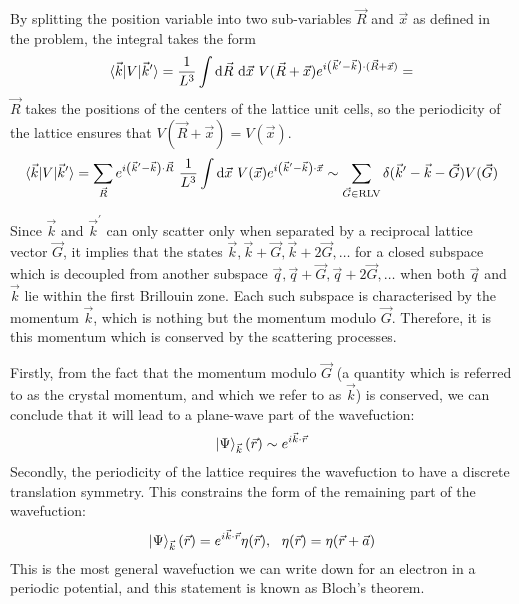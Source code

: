 \documentclass[12pt,onecolumn]{revtex4-2}
\begin{document}
By splitting the position variable into two sub-variables \(\vec R\) and \(\vec x\) as defined in the problem, the integral takes the form
\begin{equation}\begin{aligned}
	\braket{\vec k | V | \vec k^\prime} =  \frac{1}{L^3}\int \mathrm{d}\vec R ~ \mathrm{d}\vec x ~V(\vec R + \vec x) e^{i\left( \vec k^\prime - \vec k \right)\cdot (\vec R + \vec x)} = 
\end{aligned}\end{equation}
\(\vec R\) takes the positions of the centers of the lattice unit cells, so the periodicity of the lattice ensures that \(V(\vec R + \vec x) = V(\vec x)\).
\begin{equation}\begin{aligned}
	\braket{\vec k | V | \vec k^\prime} =  \sum_{\vec R} e^{i\left( \vec k^\prime - \vec k \right)\cdot \vec R} ~ \frac{1}{L^3}\int \mathrm{d}\vec x ~V(\vec x) e^{i\left( \vec k^\prime - \vec k \right)\cdot \vec x} \sim \sum_{\vec G\in\text{RLV}}\delta(\vec k^\prime - \vec k - \vec G) V(\vec G)
\end{aligned}\end{equation}

Since \(\vec k\) and \(\vec k^\prime\) can only scatter only when separated by a reciprocal lattice vector \(\vec G\), it implies that the states \(\vec k, \vec k+ \vec G, \vec k + 2\vec G,\ldots\) for a closed subspace which is decoupled from another subspace \(\vec q, \vec q+ \vec G, \vec q + 2\vec G,\ldots\) when both \(\vec q\) and \(\vec k\) lie within the first Brillouin zone. Each such subspace is characterised by the momentum \(\vec k\), which is nothing but the momentum modulo \(\vec G\). Therefore, it is this momentum which is conserved by the scattering processes.

Firstly, from the fact that the momentum modulo \(\vec G\) (a quantity which is referred to as the crystal momentum, and which we refer to as \(\vec k\)) is conserved, we can conclude that it will lead to a plane-wave part of the wavefuction:
\begin{equation}\begin{aligned}
	\ket{\Psi}_{\vec k}(\vec r) \sim e^{i \vec{k}\cdot\vec{r}}
\end{aligned}\end{equation}
Secondly, the periodicity of the lattice requires the wavefuction to have a discrete translation symmetry. This constrains the form of the remaining part of the wavefuction:
\begin{equation}\begin{aligned}
	\ket{\Psi}_{\vec k}(\vec r) = e^{i \vec{k}\cdot\vec{r}} \eta(\vec r), ~ ~ \eta(\vec r) = \eta(\vec r + \vec a)
\end{aligned}\end{equation}
This is the most general wavefuction we can write down for an electron in a periodic potential, and this statement is known as Bloch's theorem.
\end{document}
